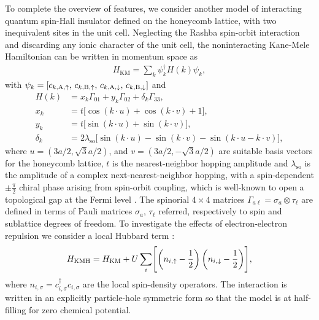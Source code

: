 \documentclass[edipack_sp.tex]{subfiles}
\begin{document}
To complete the overview of \NAME features, we consider another
model of interacting quantum spin-Hall insulator defined on the honeycomb lattice, with two inequivalent sites in the unit cell. Neglecting the Rashba spin-orbit interaction and discarding any ionic character of the unit cell, the noninteracting Kane-Mele Hamiltonian \cite{Kane2005PRLa,Kane2005PRL} can be written in momentum space as
\begin{align*}
    H_\mathrm{KM} = \sum_{{k}} \psi^\dagger_{{k}} H({k}) \psi_{{k}},
\end{align*}
with $\psi_{{k}} = [c_{{k},\mathrm{A},\uparrow},\,c_{{k},\mathrm{B},\uparrow},\,c_{{k},\mathrm{A},\downarrow},\,c_{{k},\mathrm{B},\downarrow}]$ and
    \begin{align}
    H({k}) 
    &= x_{{k}}\Gamma_{01} + y_{{k}}\Gamma_{02} + \delta_{{k}}\Gamma_{33}, \label{eq:Hk_kanemele}\\[1mm]
   x_{{k}}&=t\bigl[\cos({k}\cdot{u})+\cos({k}\cdot{v})+1\bigr],\nonumber\\
   y_{{k}}&=t\bigl[\sin({k}\cdot{u})+\sin({k}\cdot{v})\bigr],\nonumber \\
   \delta_{{k}}&=2\lambda_\mathrm{so}\bigl[\sin({k}\cdot{u})-\sin({k}\cdot{v}) - \sin({k}\cdot{u} -{k}\cdot{v})\bigr], \nonumber
\end{align}
where ${u} = (3a/2, \sqrt{3}a/2)$, and ${v} = (3a/2, -\sqrt{3}a/2)$ 
are suitable basis vectors for the honeycomb lattice, $t$ is the
nearest-neighbor hopping amplitude and $\lambda_\mathrm{so}$ is 
the amplitude of a complex next-nearest-neighbor hopping,
with a spin-dependent $\pm\tfrac{\pi}{2}$ chiral phase arising from spin-orbit coupling, which is well-known to open a topological gap at the Fermi level \cite{Kane2005PRLa,Kane2005PRL}.
The spinorial $4\times4$ matrices $\Gamma_{a\ell} = \sigma_a\otimes\tau_\ell$ are 
defined in terms of Pauli matrices $\sigma_a$, $\tau_\ell$ referred, respectively 
to spin and sublattice degrees of freedom.
To investigate the effects of electron-electron repulsion we consider a local Hubbard term \cite{Hohenadler2013ROPIP,Rachel2018ROPIP}:
\begin{equation}
    H_\mathrm{KMH}  = H_\mathrm{KM} 
    + U\sum_{i}\Biggl[
                        \left(n_{i,\uparrow} - \frac{1}{2}\right)
                        \left(n_{i,\downarrow} - \frac{1}{2}\right)
                      \Biggr],
    \label{eq:KMHmodel}
\end{equation}
where $n_{i,\sigma}=c^\dagger_{i,\sigma}c_{i,\sigma}$ are the 
local spin-density operators. The interaction is written in an explicitly 
particle-hole symmetric form so that the model is at half-filling for zero
chemical potential.
\end{document}
